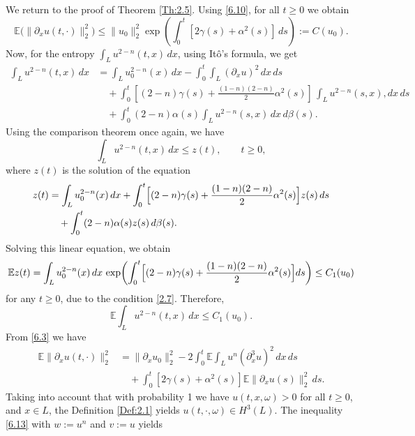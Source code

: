 \documentclass[a4paper,12pt]{article}
\numberwithin{equation}{section}
\def\d{\partial}
\begin{document}
\medskip

We return to the proof of Theorem \ref{Th:2.5}.
Using \eqref{6.10}, for all $t\ge 0$ we obtain
\begin{equation}\label{6.15}
\mathbb{E}\bigl(\|\partial_x u(t, \cdot)\|_2^2\bigr)
\le \|u_0\|_2^2
\exp\!\left(
\int_0^t [2\gamma(s)+\alpha^2(s)]\,ds
\right)
:= C(u_0).
\end{equation}
Now, for the entropy $\displaystyle \int_L u^{2-n}(t,x)\,dx$, using It\^o's formula, we get
\begin{align*}
\int_L u^{2-n}(t,x)\,dx
&= \int_L u_0^{2-n}(x)\,dx
- \int_0^t \!\!\int_L (\d_x u)^2\, dx \, ds \nonumber\\
&\quad + \int_0^t \left[(2-n) \gamma(s) + \frac{(1-n)(2-n)}{2} \alpha^2(s)\right]\,\!\!\int_L u^{2-n}(s,x),dx\,ds  \nonumber\\
&\quad + \int_0^t (2-n)\alpha(s)
\int_L u^{2-n}(s,x)\,dx\, d\beta(s).
\end{align*}
Using the comparison theorem once again, we have
\begin{equation*}\label{6.16}
\int_L u^{2-n}(t,x)\,dx \le z(t), \qquad t\ge0,
\end{equation*}
where $z(t)$ is the solution of the equation
\begin{align*}
z(t)
&= \int_L u_0^{2-n}(x)\,dx
+ \int_0^t
\Bigl[(2-n)\gamma(s)
+ \frac{(1-n)(2-n)}{2}\alpha^2(s)\Bigr]
z(s)\,ds \\
&\quad + \int_0^t (2-n)\alpha(s) z(s)\,d\beta(s).
\end{align*}
Solving this linear equation, we obtain
\[
\mathbb{E} z(t)
= \int_L u_0^{2-n}(x)\,dx\,
\exp\!\left(
\int_0^t
\Bigl[(2-n)\gamma(s)
+ \frac{(1-n)(2-n)}{2}\alpha^2(s)\Bigr] ds
\right)
\le C_1(u_0)
\]
for any $t\ge0$, due to the condition \eqref{2.7}. 
Therefore, 
\begin{equation}\label{6.17}
\mathbb{E}\int_L u^{2-n}(t,x)\,dx \le C_1(u_0).
\end{equation}
From \eqref{6.3} we have
\begin{align}\label{6.18}
\mathbb{E}\|\partial_x u(t, \cdot)\|_2^2
&= \|\partial_x u_0\|_2^2
- 2 \int_0^t \mathbb{E}\int_L u^n (\partial_x^3 u)^2 \, dx\, ds  \nonumber\\
&\quad + \int_0^t [2\gamma(s)+\alpha^2(s)]
\mathbb{E}\|\partial_x u(s)\|_2^2 \, ds.
\end{align}
Taking into account
that with probability 1 we have $u(t,x,\omega)>0$ for all $t\ge0$, and $x\in L$, the Definition \ref{Def:2.1} yields $u(t,\cdot,\omega) \in H^3(L)$. The inequality \eqref{6.13} with $w:=u^n$ and $v:=u$ yields
\end{document}
